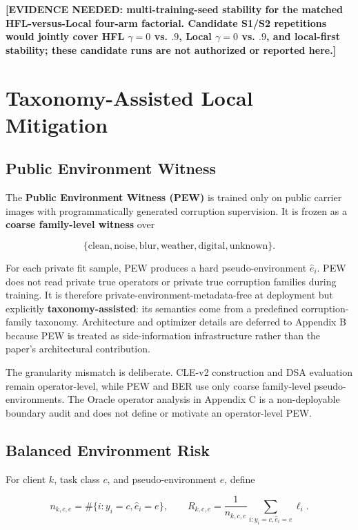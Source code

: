 \textbf{[EVIDENCE NEEDED: multi-training-seed stability for the matched HFL-versus-Local four-arm factorial. Candidate S1/S2 repetitions would jointly cover HFL \(\gamma=0\) vs. \(.9\), Local \(\gamma=0\) vs. \(.9\), and local-first stability; these candidate runs are not authorized or reported here.]}

\section{Taxonomy-Assisted Local Mitigation}

\subsection{Public Environment Witness}

The \textbf{Public Environment Witness (PEW)} is trained only on public carrier images with programmatically generated corruption supervision. It is frozen as a \textbf{coarse family-level witness} over

\[
\{\text{clean},\text{noise},\text{blur},\text{weather},\text{digital},\text{unknown}\}.
\]

For each private fit sample, PEW produces a hard pseudo-environment \(\hat e_i\). PEW does not read private true operators or private true corruption families during training. It is therefore private-environment-metadata-free at deployment but explicitly \textbf{taxonomy-assisted}: its semantics come from a predefined corruption-family taxonomy. Architecture and optimizer details are deferred to Appendix B because PEW is treated as side-information infrastructure rather than the paper's architectural contribution.

The granularity mismatch is deliberate. CLE-v2 construction and DSA evaluation remain operator-level, while PEW and BER use only coarse family-level pseudo-environments. The Oracle operator analysis in Appendix C is a non-deployable boundary audit and does not define or motivate an operator-level PEW.

\subsection{Balanced Environment Risk}

For client \(k\), task class \(c\), and pseudo-environment \(e\), define

\[
n_{k,c,e}=\#\{i:y_i=c,\hat e_i=e\},
\qquad
R_{k,c,e}=\frac1{n_{k,c,e}}\sum_{i:y_i=c,\hat e_i=e}\ell_i.
\]

